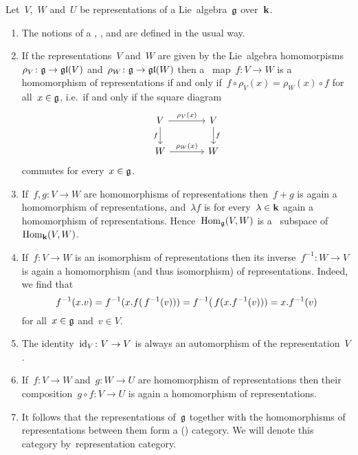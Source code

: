 \begin{remark}
  Let~$V$,~$W$ and~$U$ be representations of a Lie~algebra~$\mathfrak{g}$ over~$\kf$.
  \begin{enumerate}
    \item
      The notions of a , ,  and  are defined in the usual way.
    \item
      If the representations~$V$ and~$W$ are given by the Lie~algebra homomorpisms~$\rho_V \colon \mathfrak{g} \to \mathfrak{gl}(V)$ and~$\rho_W \colon \mathfrak{g} \to \mathfrak{gl}(W)$ then a~{\linear{$\kf$}} map~$f \colon V \to W$ is a homomorphism of representations if and only if~$f \circ \rho_V(x) = \rho_W(x) \circ f$ for all~$x \in \mathfrak{g}$, i.e.\ if and only if the square diagram
      \[
        \begin{tikzcd}[column sep = large]
          V
          \arrow{r}[above]{\rho_V(x)}
          \arrow{d}[left]{f}
          &
          V
          \arrow{d}[right]{f}
          \\
          W
          \arrow{r}[above]{\rho_W(x)}
          &
          W
        \end{tikzcd}
      \]
      commutes for every~$x \in \mathfrak{g}$.
    \item
      If~$f, g \colon V \to W$ are homomorphisms of representations then~$f + g$ is again a homomorphism of representations, and~$\lambda f$ is for every~$\lambda \in \mathbf{k}$ again a homomorphism of representations.
      Hence~$\operatorname{Hom}_{\mathfrak{g}}(V,W)$ is a~{\linear{$\kf$}} subspace of~$\operatorname{Hom}_{\mathbf{k}}(V,W)$.
    \item
      If~$f \colon V \to W$ is an isomorphism of representations then its inverse~$f^{-1} \colon W \to V$ is again a homomorphism (and thus isomorphism) of representations.
      Indeed, we find that
      \[
        f^{-1}(x.v)
        =
        f^{-1}(x.f(\, f^{-1}(v)))
        =
        f^{-1}(\, f(x.f^{-1}(v)))
        =
        x.f^{-1}(v)
      \]
      for all~$x \in \mathfrak{g}$ and~$v \in V$.
    \item
      The identity~$\operatorname{id}_V \colon V \to V$ is always an automorphism of the representation~$V$.
    \item
      If~$f \colon V \to W$ and~$g \colon W \to U$ are homomorphism of representations then their composition~$g \circ f \colon V \to U$ is again a homomorphism of representations.
    \item
      It follows that the representations of~$\mathfrak{g}$ together with the homomorphisms of representations between them form a (\linear{$\kf$}) category.
      We will denote this category by~\gls*{representation category}.
  \end{enumerate}
\end{remark}


